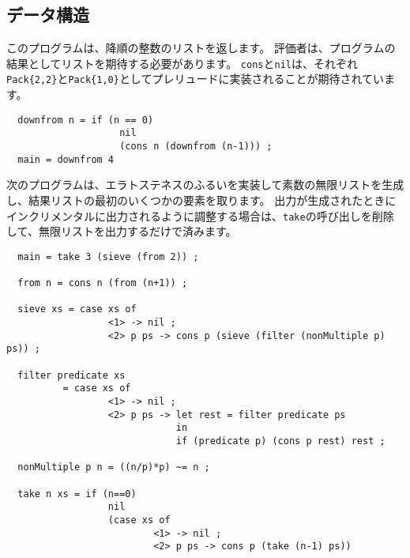\documentclass{jarticle}
\begin{document}
\subsection{データ構造}

このプログラムは、降順の整数のリストを返します。
評価者は、プログラムの結果としてリストを期待する必要があります。
\texttt{cons}と\texttt{nil}は、それぞれ\texttt{Pack\{2,2\}}と\texttt{Pack\{1,0\}}としてプレリュードに実装されることが期待されています。

\begin{verbatim}
  downfrom n = if (n == 0)
                    nil
                    (cons n (downfrom (n-1))) ;
  main = downfrom 4
\end{verbatim}

次のプログラムは、エラトステネスのふるいを実装して素数の無限リストを生成し、結果リストの最初のいくつかの要素を取ります。
出力が生成されたときにインクリメンタルに出力されるように調整する場合は、\texttt{take}の呼び出しを削除して、無限リストを出力するだけで済みます。

\begin{verbatim}
  main = take 3 (sieve (from 2)) ;

  from n = cons n (from (n+1)) ;

  sieve xs = case xs of
                  <1> -> nil ;
                  <2> p ps -> cons p (sieve (filter (nonMultiple p) ps)) ;

  filter predicate xs
          = case xs of
                  <1> -> nil ;
                  <2> p ps -> let rest = filter predicate ps
                              in
                              if (predicate p) (cons p rest) rest ;

  nonMultiple p n = ((n/p)*p) ~= n ;

  take n xs = if (n==0)
                  nil
                  (case xs of
                          <1> -> nil ;
                          <2> p ps -> cons p (take (n-1) ps))
\end{verbatim}
\end{document}
